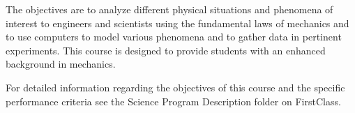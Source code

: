 {The objectives are to analyze different physical situations and phenomena of interest to engineers and scientists using the fundamental laws of mechanics and to use computers to model various phenomena and to gather data in pertinent experiments.  This course is designed to provide students with an enhanced background in mechanics.
\smallskip

For detailed information regarding the objectives of this course and the specific performance criteria see the Science Program Description folder on FirstClass.}
